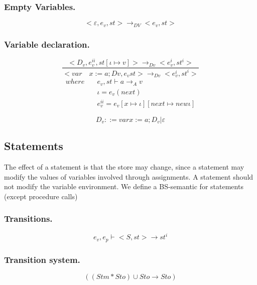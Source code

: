 \subsubsection{Empty Variables.}
\begin{equation}
	<\varepsilon,{ e }_{ v },st>{ \rightarrow  }_{ DV }<{ e }_{ v },st>
\end{equation}


\subsubsection{Variable declaration.}
\begin{equation}
	\frac { <{ D }_{ v },{ e }_{ v }^{ ii },st[\iota \mapsto v]>{ \rightarrow  }_{ Dv }<{ e }_{ v }^{ i },{ st }^{ i }> }{ <var\quad x:=a;Dv,{ e }_{ v }st>{ \rightarrow  }_{ Dv }<{ e }_{ v }^{ i },{ st }^{ i }> } 
\end{equation}
\begin{align*}
	where\quad &{ e }_{ v },st\vdash a{ \rightarrow  }_{ A }v \\
	&\iota {= e }_{ v }(next) \\
	&{ e }_{ v }^{ ii }={ e }_{ v }[x\mapsto \iota ][next\mapsto new \iota ]
\end{align*}

\begin{equation}
	{ D }_{ v }::=var x:=a; { D }_{ v } | \varepsilon
\end{equation}


\subsection*{Statements}
The effect of a statement is that the store may change, since a statement may modify the values of variables involved through assignments.
A statement should not modify the variable environment.
We define a BS-semantic for statements (except procedure calls)

\subsubsection{Transitions.}
\begin{equation}
	{ e }_{ v },{ e }_{ p }\vdash <S,st>\rightarrow { st }^{ i }
\end{equation}


\subsubsection{Transition system.}
\begin{equation}
	{((Stm\ast  Sto)\cup Sto \rightarrow Sto) }
\end{equation}


